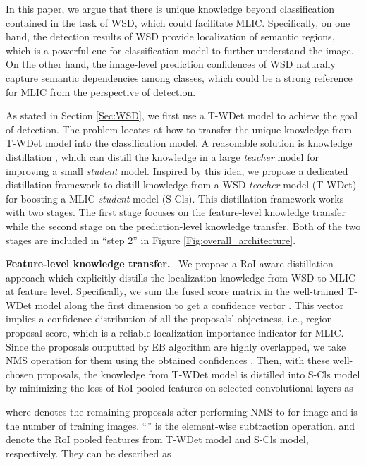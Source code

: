 \documentclass[sigconf,natbib=false]{acmart}
\begin{document}
In this paper, we argue that there is unique knowledge beyond classification contained in the task of WSD, which could facilitate MLIC.
Specifically, on one hand, the detection results of WSD provide localization of semantic regions, which is a powerful cue for classification model to further understand the image.
On the other hand, the image-level prediction confidences of WSD naturally capture semantic dependencies among classes, which could be a strong reference for MLIC from the perspective of detection.

As stated in Section \ref{Sec:WSD}, we first use a T-WDet model to achieve the goal of detection. The problem locates at how to transfer the unique knowledge from T-WDet model into the classification model. A reasonable solution is knowledge distillation \cite{KD1_nips15_goj}, which can distill the knowledge in a large \emph{teacher} model for improving a small \emph{student} model. Inspired by this idea, we propose a dedicated distillation framework to distill knowledge from a WSD \emph{teacher} model (T-WDet) for boosting a MLIC \emph{student} model (S-Cls). This distillation framework works with two stages. The first stage focuses on the feature-level knowledge transfer while the second stage on the prediction-level knowledge transfer. Both of the two stages are included in ``step 2'' in Figure \ref{Fig:overall_architecture}.

\vspace{+1mm}
\noindent \textbf{Feature-level knowledge transfer.} \ We propose a RoI-aware distillation approach which explicitly distills the localization knowledge from WSD to MLIC at feature level. Specifically, we sum the fused score matrix  in the well-trained T-WDet model along the first dimension  to get a confidence vector .
This vector implies a confidence distribution of all the proposals' objectness, i.e., region proposal score, which is a reliable localization importance indicator for MLIC.
Since the proposals outputted by EB algorithm are highly overlapped, we take NMS operation for them using the obtained confidences . Then, with these well-chosen proposals, the knowledge from T-WDet model is distilled into S-Cls model by minimizing the  loss of RoI pooled features on selected convolutional layers as

where  denotes the remaining proposals after performing NMS to  for image  and  is the number of training images. ``'' is the element-wise subtraction operation.  and  denote the RoI pooled features from T-WDet model and S-Cls model, respectively. They can be described as
\end{document}
